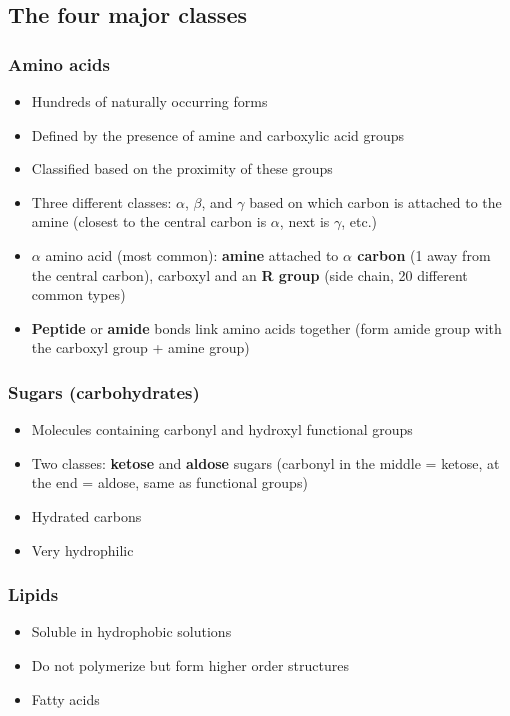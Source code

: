 \documentclass[a4paper, 12pt]{article}
\begin{document}
\subsection*{The four major classes}

\subsubsection*{Amino acids}

\begin{itemize}
\item Hundreds of naturally occurring forms
\item Defined by the presence of amine and carboxylic acid groups
\item Classified based on the proximity of these groups
\item Three different classes: $\alpha$, $\beta$, and $\gamma$ based on which carbon is attached to the amine (closest to the central carbon is $\alpha$, next is $\gamma$, etc.)
\item $\alpha$ amino acid (most common): \textbf{amine} attached to \textbf{$\alpha$ carbon} (1 away from the central carbon), carboxyl and an \textbf{R group} (side chain, 20 different common types)
\item \textbf{Peptide} or \textbf{amide} bonds link amino acids together (form amide group with the carboxyl group + amine group)
\end{itemize}

\subsubsection*{Sugars (carbohydrates)}

\begin{itemize}
\item Molecules containing carbonyl and hydroxyl functional groups
\item Two classes: \textbf{ketose} and \textbf{aldose} sugars (carbonyl in the middle = ketose, at the end = aldose, same as functional groups)
\item Hydrated carbons
\item Very hydrophilic
\end{itemize}

\subsubsection*{Lipids}

\begin{itemize}
\item Soluble in hydrophobic solutions
\item Do not polymerize but form higher order structures
\item Fatty acids
\end{itemize}
\end{document}

